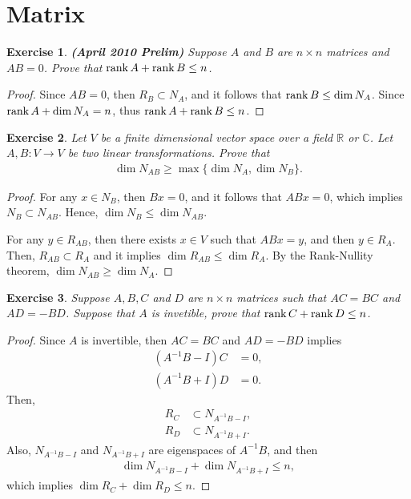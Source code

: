 \documentclass[10pt]{book}
\newtheorem{exercise}{Exercise}[section]
\theoremstyle{definition}
\numberwithin{equation}{chapter}
\begin{document}
\medskip

\section{Matrix}
\begin{exercise}{\bf (April 2010 Prelim)}
Suppose $A$ and $B$ are $n \times n$ matrices and $AB = 0$. Prove that $\rank A + \rank B \leq n$.
\end{exercise}
\begin{proof}
Since $AB = 0$, then $R_B \subset N_A$, and it follows that $\rank B \leq \dim N_A$. Since $\rank A + \dim N_A = n$, thus $\rank A + \rank B \leq n$.
\end{proof}

\medskip

\begin{exercise}
Let $V$ be a finite dimensional vector space over a field $\mathbb{R}$ or $\mathbb{C}$. Let $A, B: V \to V$ be two linear transformations. Prove that
\begin{align*}
    \dim N_{AB} \geq \max\{\dim N_A, \dim N_B\}.
\end{align*}
\end{exercise}
\begin{proof}
For any $x \in N_B$, then $Bx = 0$, and it follows that $ABx = 0$, which implies $N_B \subset N_{AB}$. Hence, $\dim N_B \leq \dim N_{AB}$.

For any $y \in R_{AB}$, then there exists $x \in V$ such that $ABx = y$, and then $y \in R_A$. Then, $R_{AB} \subset R_A$ and it implies $\dim R_{AB} \leq \dim R_A$. By the Rank-Nullity theorem, $\dim N_{AB} \geq \dim N_A$.
\end{proof}

\medskip

\begin{exercise}
Suppose $A, B, C$ and $D$ are $n \times n$ matrices such that $AC = BC$ and $AD = - BD$. Suppose that $A$ is invetible, prove that $\rank C + \rank D \leq n$.
\end{exercise}
\begin{proof}
Since $A$ is invertible, then $AC = BC$ and $AD = - BD$ implies
\begin{align*}
    \left(A^{-1} B - I \right)C & = 0, \\
    \left(A^{-1} B + I \right)D & = 0.
\end{align*}
Then, 
\begin{align*}
    R_C & \subset N_{A^{-1} B - I}, \\
    R_D & \subset N_{A^{-1} B + I}.
\end{align*}
Also, $N_{A^{-1} B - I}$ and $N_{A^{-1} B + I}$ are eigenspaces of $A^{-1}B$, and then
\begin{align*}
    \dim N_{A^{-1} B - I} + \dim N_{A^{-1} B + I} \leq n,
\end{align*}
which implies $\dim R_C + \dim R_D \leq n$.
\end{proof}
\end{document}
